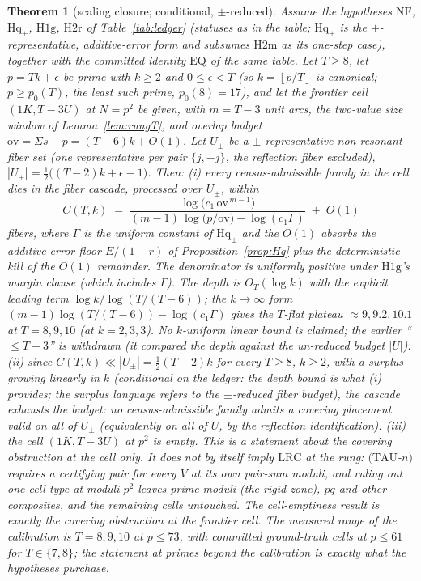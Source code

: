 \documentclass[11pt,a4paper]{article}
\numberwithin{equation}{section}
\theoremstyle{plain}
\theoremstyle{plain}
\newtheorem{theorem}{Theorem}[section]
\theoremstyle{definition}
\theoremstyle{remark}
\newcommand{\floor}[1]{\left\lfloor #1 \right\rfloor}
\begin{document}
\begin{theorem}[scaling closure; conditional, $\pm$-reduced]\label{thm:SC}
Assume the hypotheses $\mathrm{NF}$, $\mathrm{Hq}_\pm$, $\mathrm{H1g}$,
$\mathrm{H2r}$ of Table~\ref{tab:ledger} (statuses as in the table;
$\mathrm{Hq}_\pm$ is the $\pm$-representative, additive-error form and
subsumes $\mathrm{H2m}$ as its one-step case), together with the
committed identity $\mathrm{EQ}$ of the same table. Let $T\ge 8$, let
$p=Tk+\epsilon$ be prime with $k\ge 2$ and $0\le\epsilon<T$ (so $k=\floor{p/T}$
is canonical; $p\ge p_0(T)$, the least such prime, $p_0(8)=17$), and let the
frontier cell $(1K,T{-}3U)$ at $N=p^2$ be given, with $m=T-3$ unit arcs, the
two-value size window of Lemma~\ref{lem:rungT}, and overlap budget
$\mathrm{ov}=\Sigma s-p=(T-6)k+O(1)$. Let $U_\pm$ be a $\pm$-representative
non-resonant fiber set (one representative per pair $\{j,-j\}$, the
reflection fiber excluded), $|U_\pm|=\tfrac12\bigl((T-2)k+\epsilon-1\bigr)$.
Then:
\smallskip
\emph{(i)} every census-admissible family in the cell dies in the fiber
cascade, processed over $U_\pm$, within
\[
C(T,k)\;=\;
\frac{\log\!\bigl(c_1\,\mathrm{ov}^{\,m-1}\bigr)}
     {(m-1)\,\log\!\bigl(p/\mathrm{ov}\bigr)-\log(c_1\Gamma)}
\;+\;O(1)
\]
fibers, where $\Gamma$ is the uniform constant of $\mathrm{Hq}_\pm$ and the
$O(1)$ absorbs the additive-error floor $E/(1-r)$ of
Proposition~\ref{prop:Hq} plus the deterministic kill of the $O(1)$
remainder. The denominator is uniformly positive under $\mathrm{H1g}$'s
margin clause (which includes $\Gamma$). The depth is $O_T(\log k)$ with the
explicit leading term $\log k/\log(T/(T-6))$; the $k\to\infty$ form
$(m-1)\log(T/(T-6))-\log(c_1\Gamma)$ gives the $T$-flat plateau
$\approx 9,9.2,10.1$ at $T=8,9,10$ (at $k=2,3,3$). \emph{No $k$-uniform
linear bound is claimed}; the earlier ``$\le T+3$'' is withdrawn (it compared
the depth against the un-reduced budget $|U|$).
\smallskip
\emph{(ii)} since $C(T,k)\ll|U_\pm|=\tfrac12(T-2)k$ for every $T\ge8$,
$k\ge2$, with a surplus growing linearly in $k$ (conditional on the ledger:
the depth bound is what (i) provides; the surplus language refers to the
$\pm$-reduced fiber budget), the cascade exhausts the budget: no
census-admissible family admits a covering placement valid on all of
$U_\pm$ (equivalently on all of $U$, by the reflection identification).
\smallskip
\emph{(iii)} the cell $(1K,T{-}3U)$ at $p^2$ is empty. \emph{This is a
statement about the covering obstruction at the cell only.} It does not by
itself imply $\mathrm{LRC}$ at the rung: $(\mathrm{TAU}$-$n)$ requires a
certifying pair for every $V$ at its own pair-sum moduli, and ruling out one
cell type at moduli $p^2$ leaves prime moduli (the rigid zone), $pq$ and
other composites, and the remaining cells untouched. The cell-emptiness
result is exactly the covering obstruction at the frontier cell.
The measured range of the calibration is $T=8,9,10$ at $p\le 73$, with
committed ground-truth cells at $p\le 61$ for $T\in\{7,8\}$; the statement
at primes beyond the calibration is exactly what the hypotheses purchase.
\end{theorem}
\end{document}
